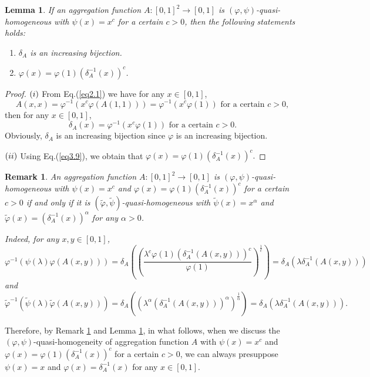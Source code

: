 \documentclass[12pt]{article}
\newtheorem{lemma}{\bf Lemma}[section]
\newtheorem{remark}{\bf Remark}[section]
\begin{document}
\begin{lemma}\label{lem3.3}
If an aggregation function $A:[0, 1]^2\rightarrow[0, 1]$ is $(\varphi, \psi)$-quasi-homogeneous with $\psi(x)=x^c$ for a certain $c>0$, then the following statements holds:
\begin{enumerate}
\item [(\romannumeral 1)] $\delta_{A}$ is an increasing bijection.
\item [(\romannumeral 2)] $\varphi(x)=\varphi(1)(\delta_{A}^{-1}(x))^c$.
\end{enumerate}
\end{lemma}
\begin{proof}
$(\romannumeral 1)$ From Eq.(\ref{eq2.1}) we have for any $x\in [0, 1]$,
$$A(x, x)=\varphi^{-1}(x^c\varphi(A(1,1)))=\varphi^{-1}(x^c\varphi(1))\mbox{ for a certain } c>0,$$
then for any $x\in [0, 1]$,
\begin{equation}\label{eq3.9}
\delta_{A}(x)=\varphi^{-1}(x^c\varphi(1))\mbox{ for a certain } c>0.
\end{equation}
Obviously, $\delta_{A}$ is an increasing bijection since $\varphi$ is an increasing bijection.

$(\romannumeral 2)$ Using Eq.(\ref{eq3.9}), we obtain that $\varphi(x)=\varphi(1)(\delta_{A}^{-1}(x))^c.$
\end{proof}

\begin{remark}\label{Remark3.1}
\emph{An aggregation function $A:[0, 1]^2\rightarrow[0, 1]$ is $(\varphi, \psi)$-quasi-homogeneous with $\psi(x)=x^c$ and $\varphi(x)=\varphi(1)(\delta_{A}^{-1}(x))^c$ for a certain $c>0$ if and only if it is $(\widetilde{\varphi}, \widetilde{\psi})$-quasi-homogeneous with $\widetilde{\psi}(x)=x^\alpha$ and $\widetilde{\varphi}(x)=(\delta_{A}^{-1}(x))^\alpha$ for any $\alpha>0$.}

    \emph{Indeed, for any }$x,y\in[0,1]$, $$\varphi^{-1}(\psi(\lambda)\varphi(A(x,y)))=\delta_{A}((\frac{\lambda^c \varphi(1)(\delta_{A}^{-1}(A(x,y)))^c}{\varphi(1)} )^{\frac{1}{c}})=\delta_{A}(\lambda \delta_{A}^{-1}(A(x,y)))$$ \emph{ and }
$$\widetilde{\varphi}^{-1}(\widetilde{\psi}(\lambda)\widetilde{\varphi}(A(x,y)))=\delta_{A}((\lambda^{\alpha} (\delta_{A}^{-1}(A(x,y)))^{\alpha} )^{\frac{1}{\alpha}})=\delta_{A}(\lambda \delta_{A}^{-1}(A(x,y))).$$
\end{remark}

Therefore, by Remark \ref{Remark3.1} and Lemma \ref{lem3.3}, in what follows, when we discuss the $(\varphi, \psi)$-quasi-homogeneity of aggregation function $A$ with $\psi(x)=x^c$ and $\varphi(x)=\varphi(1)(\delta_{A}^{-1}(x))^c$ for a certain $c>0$, we can always presuppose $\psi(x)=x$ and $\varphi(x)=\delta_{A}^{-1}(x)$ for any $x\in [0, 1]$.
\end{document}
